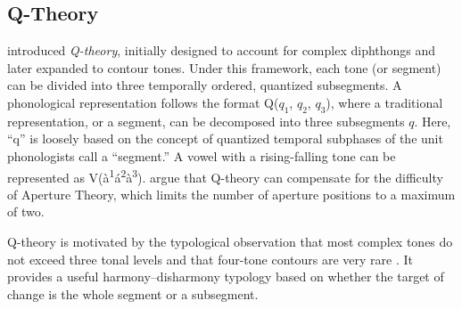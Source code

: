 \subsection{Q-Theory}

\citet{inkelas2013abc+} introduced \textit{Q-theory}, initially designed to account
for complex diphthongs and later expanded to contour tones. Under this
framework, each tone (or segment) can be divided into three temporally ordered,
quantized subsegments. A phonological representation follows the format
Q($q_1$, $q_2$, $q_3$), where a traditional representation, or a segment, can be
decomposed into three subsegments $q$. Here, ``q'' is loosely based on the concept
of quantized temporal subphases of the unit phonologists call a ``segment.''
A vowel with a rising-falling tone can be represented as
V(à\textsuperscript{1}á\textsuperscript{2}à\textsuperscript{3}).
\citet{inkelas2013abc+} argue that Q-theory can compensate for the difficulty of
Aperture Theory, which limits the number of aperture positions to a maximum of
two.

Q-theory is motivated by the typological observation that most complex tones do
not exceed three tonal levels and that four-tone contours are very rare
\citep{shih2013subsegmental}. It provides a useful harmony--disharmony typology
based on whether the target of change is the whole segment or a subsegment.


		
		

